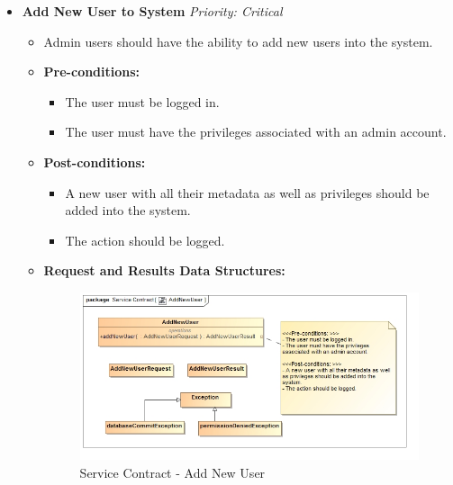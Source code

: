 \documentclass{article}
\begin{document}
				\begin{itemize}
					\item \textbf{Add New User to System} \hfill \textit{Priority: Critical}
					\begin{itemize}
						\item Admin users should have the ability to add new users into the system.
						\item \textbf{Pre-conditions:}
						\begin{itemize}
							\item The user must be logged in.
							\item The user must have the privileges associated with an admin account.
						\end{itemize}
						\item \textbf{Post-conditions:}
						\begin{itemize}
							\item A new user with all their metadata as well as privileges should be added into the system.
							\item The action should be logged.
						\end{itemize}
						\item \textbf{Request and Results Data Structures:}
						\begin{figure}[H]
							\includegraphics[width=\linewidth]{../Diagrams/ServiceContracts/User subsystem/AddNewUser.jpg}
							\caption{Service Contract - Add New User}
						\end{figure}
					\end{itemize}
					

\end{itemize}
\end{document}
